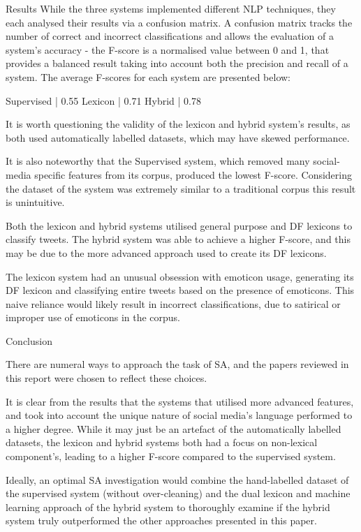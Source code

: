 Results
While the three systems implemented different NLP techniques, they each
analysed their results via a confusion matrix.
A confusion matrix tracks the number of correct and incorrect classifications
and allows the evaluation of a system's accuracy - the F-score is a normalised
value between 0 and 1, that provides a balanced result taking into account
both the precision and recall of a system.
The average F-scores for each system are presented below:

Supervised  |   0.55
Lexicon     |   0.71
Hybrid      |   0.78

It is worth questioning the validity of the lexicon and hybrid system's
results, as both used automatically labelled datasets, which may have skewed
performance.

It is also noteworthy that the Supervised system, which removed many
social-media specific features from its corpus, produced the lowest F-score.
Considering the dataset of the system was extremely similar to a traditional
corpus this result is unintuitive.

Both the lexicon and hybrid systems utilised general purpose and DF lexicons to
classify tweets.
The hybrid system was able to achieve a higher F-score, and this may be due to
the more advanced approach used to create its DF lexicons.

The lexicon system had an unusual obsession with emoticon usage, generating
its DF lexicon and classifying entire tweets based on the presence of
emoticons.
This naive reliance would likely result in incorrect classifications, due to satirical or improper use of emoticons in the corpus.


Conclusion


There are numeral ways to approach the task of SA, and the papers reviewed in
this report were chosen to reflect these choices.

It is clear from the results that the systems that utilised more advanced
features, and took into account the unique nature of social media's language
performed to a higher degree.
While it may just be an artefact of the automatically labelled datasets, the
lexicon and hybrid systems both had a focus on non-lexical component's,
leading to a higher F-score compared to the supervised system.

Ideally, an optimal SA investigation would combine the hand-labelled dataset
of the supervised system (without over-cleaning) and the dual lexicon and
machine learning  approach of the hybrid system to thoroughly examine if the
hybrid system truly outperformed the other approaches presented in this paper.

